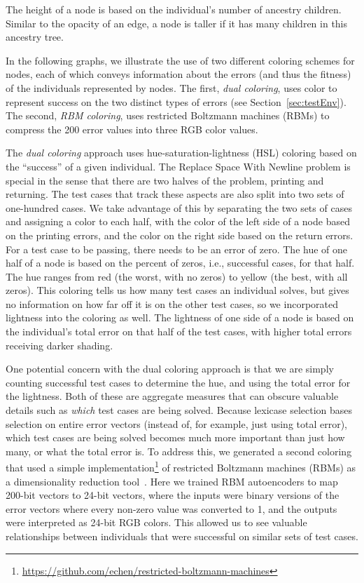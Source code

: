 \documentclass{sig-alternate}
\begin{document}
The height of a node is based on the individual's number of ancestry children. Similar to the opacity of an edge, a node is taller if it has many children in this ancestry tree. 

In the following graphs, we illustrate the use of two different coloring 
schemes for nodes, each of which conveys information about the errors 
(and thus the fitness) of the individuals represented by nodes. 
The first, \emph{dual coloring}, uses color to represent success on the 
two distinct types of errors (see Section~\ref{sec:testEnv}). The second,
\emph{RBM coloring}, uses restricted Boltzmann machines (RBMs) to compress
the 200 error values into three RGB color values.

The \emph{dual coloring} approach uses hue-saturation-lightness (HSL) coloring
based on the ``success'' of a given individual. 
The Replace Space With Newline problem is special in the sense that there are 
two halves of the problem, printing and returning. The test cases that track 
these aspects are also split into two sets of one-hundred cases. We take 
advantage of this by separating the two sets of cases and assigning a color 
to each half, with the color of the left side of a node based on the
printing errors, and the color on the right side based on the return errors.
For a test case to be passing, there needs to be an error of zero. 
The hue of one half of a node is based on the percent of zeros, i.e., 
successful cases, for that half. The hue 
ranges from red (the worst, with no zeros) to yellow (the best, with all zeros). 
This coloring tells us how many test cases an individual solves, but gives no 
information on how far off it is on the other test cases, so we incorporated 
lightness into the coloring as well. The lightness of one side of a node is 
based on the individual's total error on that half of the test cases, with 
higher total errors receiving darker shading.

One potential concern with the dual coloring approach is that we are simply 
counting successful test cases to determine the hue, and using the total
error for the lightness. Both of these are aggregate measures that can obscure
valuable details such as \emph{which} test cases are being solved. Because
lexicase selection bases selection on entire error vectors (instead of, for example,
just using total error), which test cases are being solved becomes much more
important than just how many, or what the total error is. To address this, we
generated a second coloring that used a simple 
implementation\footnote{\url{https://github.com/echen/restricted-boltzmann-machines}} 
of restricted Boltzmann machines (RBMs) as a dimensionality reduction 
tool~\cite{hinton2006reducing}. Here we trained RBM autoencoders to map 200-bit
vectors to 24-bit vectors, where the inputs were binary versions of the error
vectors where every non-zero value was converted to 1, and the outputs were
interpreted as 24-bit RGB colors. This allowed us to see valuable relationships
between individuals that were successful on similar sets of test cases.
\end{document}

